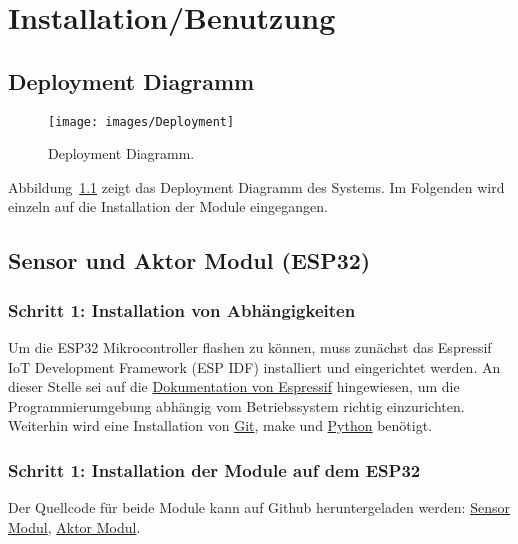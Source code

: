 \chapter{Installation/Benutzung}
\label{cha:Installation/Benutzung}

\section{Deployment Diagramm}

\begin{figure}[hbt]
	\centering
	\texttt{[image: images/Deployment]}
	\caption[Deployment Diagramm]{Deployment Diagramm.}
	\label{fig:deployment_diagramm}
\end{figure}

Abbildung~\ref{fig:deployment_diagramm} zeigt das Deployment Diagramm des Systems. Im Folgenden wird einzeln auf die Installation der Module eingegangen.

\section{Sensor und Aktor Modul (ESP32)}
\label{cha:Installation_IDF}
\subsection{Schritt 1: Installation von Abhängigkeiten}
Um die ESP32 Mikrocontroller flashen zu können, muss zunächst das Espressif IoT Development Framework (ESP IDF) installiert und eingerichtet werden. An dieser Stelle sei auf die \href{https://docs.espressif.com/projects/esp-idf/en/latest/index.html}{Dokumentation von Espressif} hingewiesen, um die Programmierumgebung abhängig vom Betriebssystem richtig einzurichten. Weiterhin wird eine Installation von \href{https://git-scm.com/downloads}{Git}, make und \href{https://www.python.org/downloads/}{Python} benötigt.

\subsection{Schritt 1: Installation der Module auf dem ESP32}
Der Quellcode für beide Module kann auf Github heruntergeladen werden: \href{https://github.com/maxbachmann-university/esp32-sensor-modul}{Sensor Modul}, \href{https://github.com/maxbachmann-university/esp32-actuator-module}{Aktor Modul}.

